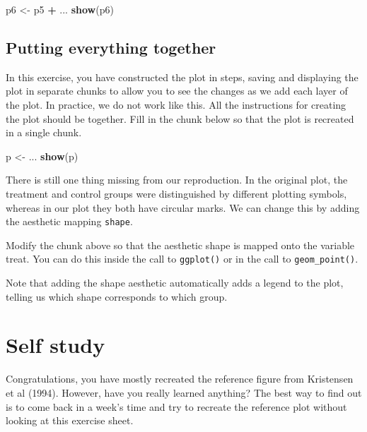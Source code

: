 \documentclass[
]{book}
\newenvironment{Shaded}{\begin{snugshade}}{\end{snugshade}}
\newcommand{\FunctionTok}[1]{\textcolor[rgb]{0.13,0.29,0.53}{\textbf{#1}}}
\newcommand{\NormalTok}[1]{#1}
\newcommand{\OtherTok}[1]{\textcolor[rgb]{0.56,0.35,0.01}{#1}}
\newcommand{\SpecialCharTok}[1]{\textcolor[rgb]{0.81,0.36,0.00}{\textbf{#1}}}
\begin{document}
\begin{Shaded}
\begin{Highlighting}[]
\NormalTok{p6 }\OtherTok{\textless{}{-}}\NormalTok{ p5 }\SpecialCharTok{+}\NormalTok{ ...}
\FunctionTok{show}\NormalTok{(p6)}
\end{Highlighting}
\end{Shaded}

\subsection{Putting everything together}\label{putting-everything-together}

In this exercise, you have constructed the plot in steps, saving and displaying the plot in separate chunks to allow you to see the changes as we add each layer of the plot. In practice, we do not work like this. All the instructions for creating the plot should be together. Fill in the chunk below so that the plot is recreated in a single chunk.

\begin{Shaded}
\begin{Highlighting}[]
\NormalTok{p }\OtherTok{\textless{}{-}}\NormalTok{ ...}
\FunctionTok{show}\NormalTok{(p)}
\end{Highlighting}
\end{Shaded}

There is still one thing missing from our reproduction. In the original plot, the treatment and control groups were distinguished by different plotting symbols, whereas in our plot they both have circular marks. We can change this by adding the aesthetic mapping \texttt{shape}.

Modify the chunk above so that the aesthetic shape is mapped onto the variable treat. You can do this inside the call to \texttt{ggplot()} or in the call to \texttt{geom\_point()}.

Note that adding the shape aesthetic automatically adds a legend to the plot, telling us which shape corresponds to which group.

\section{Self study}\label{self-study}

Congratulations, you have mostly recreated the reference figure from Kristensen et al (1994). However, have you really learned anything? The best way to find out is to come back in a week's time and try to recreate the reference plot without looking at this exercise sheet.
\end{document}
